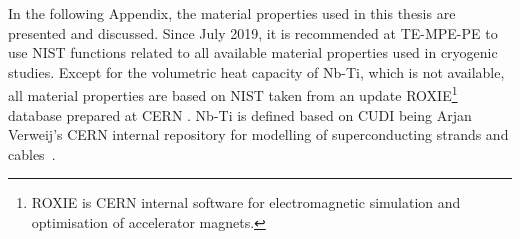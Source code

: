 
In the following Appendix, the material properties used in this thesis are presented and discussed. Since July 2019, it is recommended at TE-MPE-PE to use NIST functions related to all available material properties used in cryogenic studies. Except for the volumetric heat capacity of Nb-Ti, which is not available, all material properties are based on NIST taken from an update ROXIE\footnote{ROXIE is CERN internal software for electromagnetic simulation and optimisation of accelerator magnets.} database prepared at CERN \cite{material_properties_roxie}. Nb-Ti is defined based on CUDI being Arjan Verweij's CERN internal repository for modelling of superconducting strands and cables~\cite{cudi_manual}.